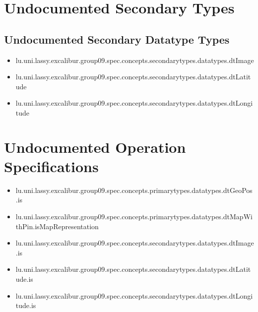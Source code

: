 \section[Undocumented Secondary Types]{Undocumented Secondary Types}


\subsection[Undocumented Secondary Datatype Types]{Undocumented Secondary Datatype Types}
\begin{itemize}
\item lu.uni.lassy.excalibur.group09.spec.concepts.secondarytypes.datatypes.dtImage 
\item lu.uni.lassy.excalibur.group09.spec.concepts.secondarytypes.datatypes.dtLatitude 
\item lu.uni.lassy.excalibur.group09.spec.concepts.secondarytypes.datatypes.dtLongitude 
\end{itemize}










\section[Undocumented Operation Specifications]{Undocumented Operation Specifications}
\begin{itemize}
\item lu.uni.lassy.excalibur.group09.spec.concepts.primarytypes.datatypes.dtGeoPos.is 
\item lu.uni.lassy.excalibur.group09.spec.concepts.primarytypes.datatypes.dtMapWithPin.isMapRepresentation 
\item lu.uni.lassy.excalibur.group09.spec.concepts.secondarytypes.datatypes.dtImage.is 
\item lu.uni.lassy.excalibur.group09.spec.concepts.secondarytypes.datatypes.dtLatitude.is 
\item lu.uni.lassy.excalibur.group09.spec.concepts.secondarytypes.datatypes.dtLongitude.is 
\end{itemize}








